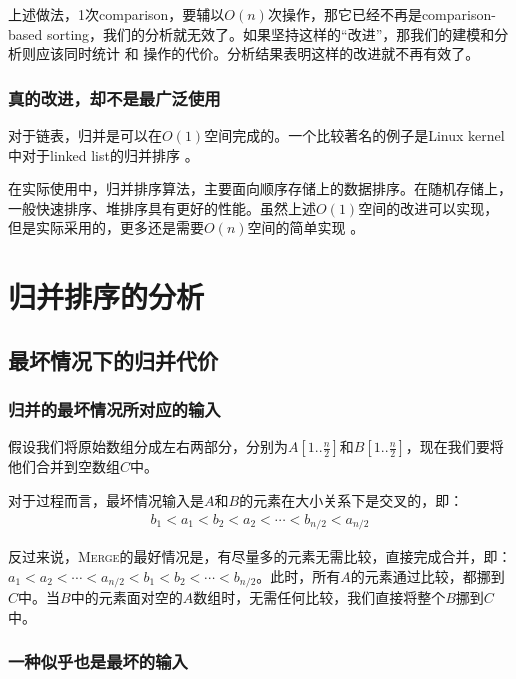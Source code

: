 上述做法，1次comparison，要辅以$O(n)$次操作，那它已经不再是comparison-based sorting，我们的分析就无效了。如果坚持这样的“改进”，那我们的建模和分析则应该同时统计  和  操作的代价。分析结果表明这样的改进就不再有效了。

\subsubsection{真的改进，却不是最广泛使用}

对于链表，归并是可以在$O(1)$空间完成的。一个比较著名的例子是Linux kernel中对于linked list的归并排序 \cite{url-list-sort26}。

在实际使用中，归并排序算法，主要面向顺序存储上的数据排序。在随机存储上，一般快速排序、堆排序具有更好的性能。虽然上述$O(1)$空间的改进可以实现，但是实际采用的，更多还是需要$O(n)$空间的简单实现 \cite{wiki-merge-sort26}。


\section{归并排序的分析}

\subsection{最坏情况下的归并代价} \label{subsec:worst-merge}

\subsubsection{归并的最坏情况所对应的输入}

假设我们将原始数组分成左右两部分，分别为$A[1..\frac{n}{2}]$和$B[1..\frac{n}{2}]$，现在我们要将他们合并到空数组$C$中。

对于过程而言，最坏情况输入是$A$和$B$的元素在大小关系下是交叉的，即：
\begin{align}
    b_1<a_1<b_2<a_2<\cdots < b_{n/2} < a_{n/2} \label{Eq:Merge-Worst-Case}
\end{align}


反过来说，\textsc{Merge}的最好情况是，有尽量多的元素无需比较，直接完成合并，即：$a_1<a_2<\cdots < a_{n/2} < b_1 < b_2 < \cdots < b_{n/2}$。此时，所有$A$的元素通过比较，都挪到$C$中。当$B$中的元素面对空的$A$数组时，无需任何比较，我们直接将整个$B$挪到$C$中。

\subsubsection{一种似乎也是最坏的输入}

